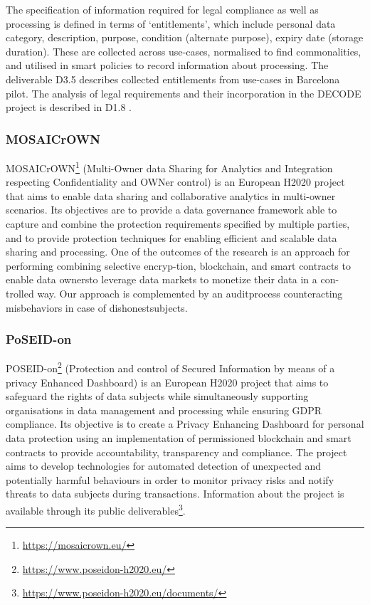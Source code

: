 The specification of information required for legal compliance as well as processing is defined in terms of `entitlements', which include personal data category, description, purpose, condition (alternate purpose), expiry date (storage duration). These are collected across use-cases, normalised to find commonalities, and utilised in smart policies to record information about processing. The deliverable D3.5 \cite{roio_d3.5_2018} describes collected entitlements from use-cases in Barcelona pilot.
The analysis of legal requirements and their incorporation in the DECODE project is described in D1.8 \cite{noauthor_d1.8_2017}.
\subsubsection{MOSAICrOWN}
MOSAICrOWN\footnote{\url{https://mosaicrown.eu/}} (Multi-Owner data Sharing for Analytics and Integration respecting Confidentiality and OWNer control) is an European H2020 project that aims to enable data sharing and collaborative analytics in multi-owner scenarios. Its objectives are to provide a data governance framework able to capture and combine the protection requirements specified by multiple parties, and to provide protection techniques for enabling efficient and scalable data sharing and processing.
One of the outcomes of the research is an approach for performing combining selective encryp-tion, blockchain, and smart contracts to enable data ownersto leverage data markets to monetize their data in a con-trolled way. Our approach is complemented by an auditprocess counteracting misbehaviors in case of dishonestsubjects.

\subsubsection{PoSEID-on}
POSEID-on\footnote{\url{https://www.poseidon-h2020.eu/}} (Protection and control of Secured Information by means of a privacy Enhanced Dashboard) is an European H2020 project that aims to safeguard the rights of data subjects
while simultaneously supporting organisations in data management and processing while ensuring GDPR compliance.
Its objective is to create a Privacy Enhancing Dashboard for personal data protection using an implementation of permissioned blockchain and smart contracts to provide accountability, transparency and compliance.
The project aims to develop technologies for automated detection of unexpected and potentially harmful behaviours in order to monitor privacy risks and notify threats to data subjects during transactions.
Information about the project is available through its public deliverables\footnote{\url{https://www.poseidon-h2020.eu/documents/}}.

